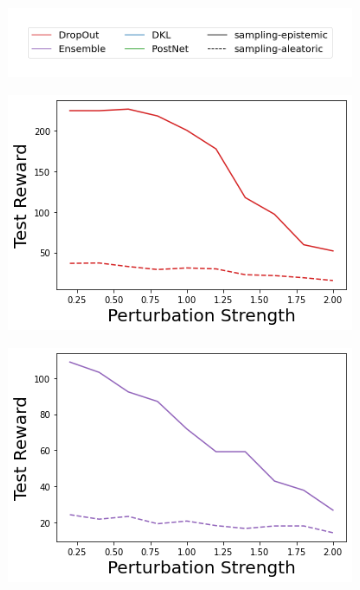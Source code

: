 \begin{figure}
    \centering
        \vspace{-3mm}
    \begin{subfigure}{.45\textwidth}
        \includegraphics[width=\textwidth]{sections/011_icml2022/resources/sampling-legend.png}
    \end{subfigure}
    \vspace{-3mm}

    \begin{subfigure}{.24\textwidth}
        \includegraphics[width=\textwidth]{sections/011_icml2022/resources/action_shift-DropOut-CartPoleShift-v0-mean_reward_.png}
    \end{subfigure}
    \begin{subfigure}{.24\textwidth}
        \includegraphics[width=\textwidth]{sections/011_icml2022/resources/action_shift-Ensemble-CartPoleShift-v0-mean_reward_.png}

\end{subfigure}
\end{figure}
